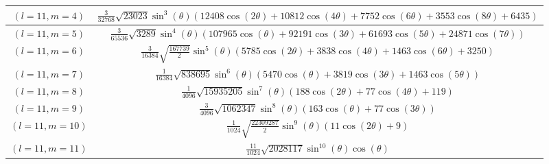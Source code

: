 \begin{center}
\begin{longtable}{|c|c|}
$(l=11, m=4)$ & $\frac{3}{32768} \sqrt{23023} \sin ^3(\theta ) (12408 \cos (2 \theta )+10812 \cos (4 \theta )+7752 \cos (6 \theta )+3553 \cos (8 \theta )+6435)$ \\ \hline
\rowcolor{gray!15}
$(l=11, m=5)$ & $\frac{3}{65536} \sqrt{3289} \sin ^4(\theta ) (107965 \cos (\theta )+92191 \cos (3 \theta )+61693 \cos (5 \theta )+24871 \cos (7 \theta ))$ \\ \hline
$(l=11, m=6)$ & $\frac{3}{16384} \sqrt{\frac{167739}{2}} \sin ^5(\theta ) (5785 \cos (2 \theta )+3838 \cos (4 \theta )+1463 \cos (6 \theta )+3250)$ \\ \hline
\rowcolor{gray!15}
$(l=11, m=7)$ & $\frac{1}{16384} \sqrt{838695} \sin ^6(\theta ) (5470 \cos (\theta )+3819 \cos (3 \theta )+1463 \cos (5 \theta ))$ \\ \hline
$(l=11, m=8)$ & $\frac{1}{4096} \sqrt{15935205} \sin ^7(\theta ) (188 \cos (2 \theta )+77 \cos (4 \theta )+119)$ \\ \hline
\rowcolor{gray!15}
$(l=11, m=9)$ & $\frac{3}{4096} \sqrt{1062347} \sin ^8(\theta ) (163 \cos (\theta )+77 \cos (3 \theta ))$ \\ \hline
$(l=11, m=10)$ & $\frac{1}{1024} \sqrt{\frac{22309287}{2}} \sin ^9(\theta ) (11 \cos (2 \theta )+9)$ \\ \hline
\rowcolor{gray!15}
$(l=11, m=11)$ & $\frac{11}{1024} \sqrt{2028117} \sin ^{10}(\theta ) \cos (\theta )$ \\ \hline
\end{longtable}
\end{center}